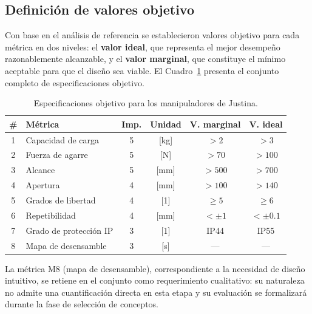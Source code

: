 \subsection{Definición de valores objetivo}

Con base en el análisis de referencia se establecieron valores objetivo para cada métrica en dos niveles: el \textbf{valor ideal}, que representa el mejor desempeño razonablemente alcanzable, y el \textbf{valor marginal}, que constituye el mínimo aceptable para que el diseño sea viable. El Cuadro~\ref{tab:especificaciones} presenta el conjunto completo de especificaciones objetivo.

\begin{table}[htbp]
\centering
\caption{Especificaciones objetivo para los manipuladores de Justina.}
\label{tab:especificaciones}
\begin{tabular}{clcccc}
\hline
\textbf{\#} & \textbf{Métrica} & \textbf{Imp.} & \textbf{Unidad} & \textbf{V. marginal} & \textbf{V. ideal} \\
\hline
1 & Capacidad de carga     & 5 & {[}kg{]}  & $>2$    & $>3$      \\
2 & Fuerza de agarre       & 5 & {[}N{]}   & $>70$   & $>100$    \\
3 & Alcance                & 5 & {[}mm{]}  & $>500$  & $>700$    \\
4 & Apertura               & 4 & {[}mm{]}  & $>100$  & $>140$    \\
5 & Grados de libertad     & 4 & {[}1{]}   & $\geq5$ & $\geq6$   \\
6 & Repetibilidad          & 4 & {[}mm{]}  & $<\pm1$ & $<\pm0.1$ \\
7 & Grado de protección IP & 3 & {[}1{]}   & IP44    & IP55      \\
8 & Mapa de desensamble    & 3 & {[}s{]}   & ---     & ---       \\
\hline
\end{tabular}
\end{table}

La métrica M8 (mapa de desensamble), correspondiente a la necesidad de diseño intuitivo, se retiene en el conjunto como requerimiento cualitativo: su naturaleza no admite una cuantificación directa en esta etapa y su evaluación se formalizará durante la fase de selección de conceptos.


